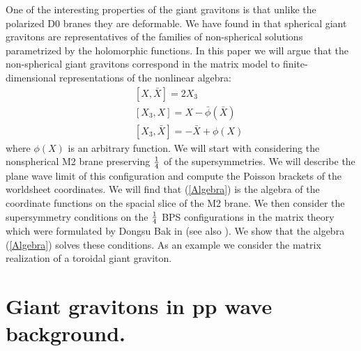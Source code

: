 \documentclass[a4paper,12pt]{article}
\begin{document}
One of the interesting properties of the giant gravitons
is that unlike the polarized D0 branes they are deformable.
We have found in \cite{AM} that spherical giant
gravitons are representatives of the families of non-spherical
solutions parametrized by the holomorphic functions.
In this paper we will argue that the non-spherical giant gravitons
correspond in the matrix model to finite-dimensional representations of the
nonlinear algebra:
\begin{eqnarray}\label{Algebra}
&& [X,\bar{X}]=2X_3\nonumber\\
&& [X_3,X]=X-\bar{\phi}(\bar{X})\\
&& [X_3,\bar{X}]=-\bar{X}+\phi(X)\nonumber
\end{eqnarray}
where $\phi(X)$ is an arbitrary function.
We will start with considering the nonspherical M2 brane preserving
$1\over 4$ of the supersymmetries. We will describe the plane
wave limit of this configuration and compute the Poisson
brackets of the worldsheet coordinates.
We will find that (\ref{Algebra}) is the algebra of the coordinate functions
on the spacial slice of the M2 brane. We then consider
the supersymmetry conditions on the $1\over 4$ BPS configurations
in the matrix theory which were formulated by Dongsu Bak in \cite{Bak}
(see also \cite{SugiyamaYoshida,HyunShin}).
We show that the algebra (\ref{Algebra}) solves these conditions.
As an example we consider the matrix realization of a toroidal giant
graviton. 

\section{Giant gravitons in pp wave background.}
\end{document}
